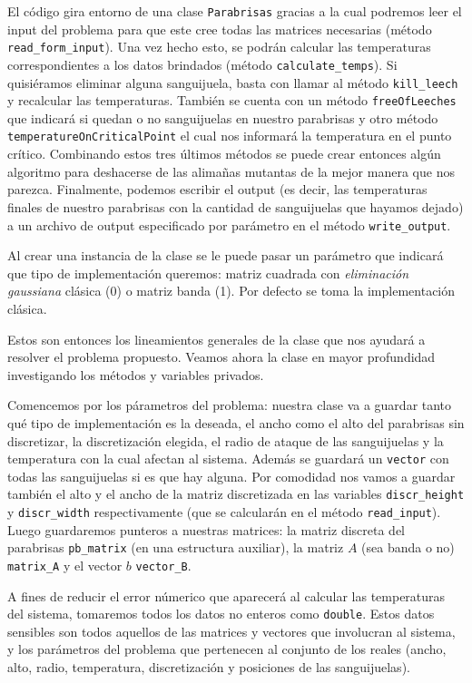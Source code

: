 El código gira entorno de una clase \texttt{Parabrisas} gracias a la cual podremos leer el input del problema para que este cree todas las matrices necesarias (método \texttt{read\_form\_input}). Una vez hecho esto, se podrán calcular las temperaturas correspondientes a los datos brindados (método \texttt{calculate\_temps}). Si quisiéramos eliminar alguna sanguijuela, basta con llamar al método \texttt{kill\_leech} y recalcular las temperaturas. También se cuenta con un método \texttt{freeOfLeeches} que indicará si quedan o no sanguijuelas en nuestro parabrisas y otro método \texttt{temperatureOnCriticalPoint} el cual nos informará la temperatura en el punto crítico. Combinando estos tres últimos métodos se puede crear entonces algún algoritmo para deshacerse de las alimañas mutantas de la mejor manera que nos parezca. Finalmente, podemos escribir el output (es decir, las temperaturas finales de nuestro parabrisas con la cantidad de sanguijuelas que hayamos dejado) a un archivo de output especificado por parámetro en el método \texttt{write\_output}.

Al crear una instancia de la clase se le puede pasar un parámetro que indicará que tipo de implementación queremos: matriz cuadrada con \textit{eliminación gaussiana} clásica (0) o matriz banda (1). Por defecto se toma la implementación clásica.

\vspace{\baselineskip}

Estos son entonces los lineamientos generales de la clase que nos ayudará a resolver el problema propuesto. Veamos ahora la clase en mayor profundidad investigando los métodos y variables privados.

Comencemos por los párametros del problema: nuestra clase va a guardar tanto qué tipo de implementación es la deseada, el ancho como el alto del parabrisas sin discretizar, la discretización elegida, el radio de ataque de las sanguijuelas y la temperatura con la cual afectan al sistema. Además se guardará un \texttt{vector} con todas las sanguijuelas si es que hay alguna. Por comodidad nos vamos a guardar también el alto y el ancho de la matriz discretizada en las variables \texttt{discr\_height} y \texttt{discr\_width} respectivamente (que se calcularán en el método \texttt{read\_input}). Luego guardaremos punteros a nuestras matrices: la matriz discreta del parabrisas \texttt{pb\_matrix} (en una estructura auxiliar), la matriz $A$ (sea banda o no) \texttt{matrix\_A} y el vector $b$ \texttt{vector\_B}.

A fines de reducir el error númerico que aparecerá al calcular las temperaturas del sistema, tomaremos todos los datos no enteros como \texttt{double}. Estos datos sensibles son todos aquellos de las matrices y vectores que involucran al sistema, y los parámetros del problema que pertenecen al conjunto de los reales (ancho, alto, radio, temperatura, discretización y posiciones de las sanguijuelas).

